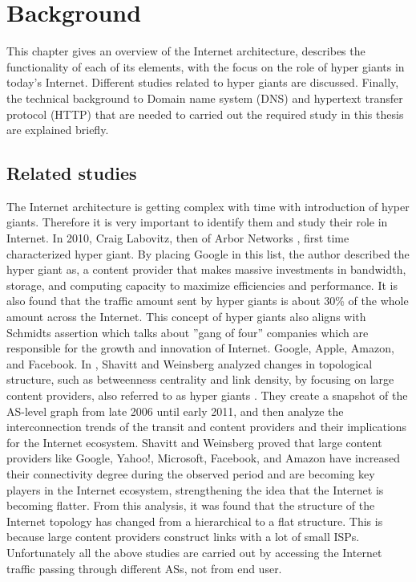 \section{Background\label{cha:chapter2}}

\noindent This chapter gives an overview of the Internet architecture, describes the functionality of each of its elements, with the focus on the role of hyper giants in today's Internet. Different studies related to hyper giants are discussed. Finally, the technical background to Domain name system (DNS) and hypertext transfer protocol (HTTP) that are needed to carried out the required  study in this thesis are explained briefly.\\

\subsection{Related studies\label{sec:related}}
\noindent The Internet architecture is getting complex with time with introduction of hyper giants. Therefore it is very important to identify them and study their role in Internet. In 2010, Craig Labovitz, then of Arbor Networks \cite{Labovitz}, first time characterized hyper giant. By placing Google in this list, the author described the hyper giant as, a content provider that makes massive investments in bandwidth, storage, and computing capacity to maximize efficiencies and performance. It is also found that the traffic amount sent by hyper giants is about 30\% of the whole amount across the Internet. This concept of hyper giants also aligns with Schmidts \cite{Schonfeld} assertion which talks about ”gang of four” companies which are responsible for the growth and innovation of Internet. Google, Apple, Amazon, and Facebook. In \cite{Shavitt}, Shavitt and Weinsberg analyzed changes in topological structure, such as betweenness centrality and link density, by focusing on large content providers, also referred to as hyper giants \cite{Labovitz} \cite{Poese}. They create a snapshot of the AS-level graph from late 2006 until early 2011, and then analyze the interconnection trends of the transit and content providers and their implications for the Internet ecosystem. Shavitt and Weinsberg proved that large content providers like Google, Yahoo!, Microsoft, Facebook, and Amazon have increased their connectivity degree during the observed period and are becoming key players in the Internet ecosystem, strengthening the idea that the Internet is becoming flatter. From this analysis, it was found that the structure of the Internet topology has changed from a hierarchical to a flat structure. This is because large content providers construct links with a lot of small ISPs. Unfortunately all the above studies are carried out by accessing the Internet traffic passing through different ASs, not from end user.

